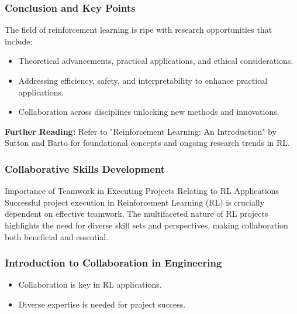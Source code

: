 \documentclass[aspectratio=169]{beamer}
\begin{document}
\begin{frame}[fragile]
    \frametitle{Conclusion and Key Points}
    The field of reinforcement learning is ripe with research opportunities that include:
    \begin{itemize}
        \item Theoretical advancements, practical applications, and ethical considerations.
        \item Addressing efficiency, safety, and interpretability to enhance practical applications.
        \item Collaboration across disciplines unlocking new methods and innovations.
    \end{itemize}
    \textbf{Further Reading:} Refer to "Reinforcement Learning: An Introduction" by Sutton and Barto for foundational concepts and ongoing research trends in RL.
\end{frame}

\begin{frame}[fragile]
    \frametitle{Collaborative Skills Development}
    \begin{block}{Importance of Teamwork in Executing Projects Relating to RL Applications}
        Successful project execution in Reinforcement Learning (RL) is crucially dependent on effective teamwork. 
        The multifaceted nature of RL projects highlights the need for diverse skill sets and perspectives, 
        making collaboration both beneficial and essential.
    \end{block}
\end{frame}

\begin{frame}[fragile]
    \frametitle{Introduction to Collaboration in Engineering}
    \begin{itemize}
        \item Collaboration is key in RL applications.
        \item Diverse expertise is needed for project success.
    \end{itemize}
\end{frame}
\end{document}
